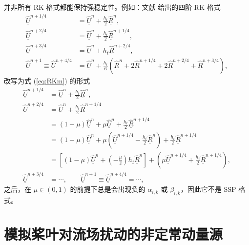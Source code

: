 并非所有 RK 格式都能保持强稳定性。例如：文献 \cite{Hirsch_2007} 给出的四阶 RK 格式
\begin{equation}
\begin{aligned}\underline{\hat{U}}^{n+1/4} & =\underline{\hat{U}}^{n}+\frac{h_{t}}{2}\underline{\hat{R}}^{n},\\
\underline{\hat{U}}^{n+2/4} & =\underline{\hat{U}}^{n}+\frac{h_{t}}{2}\underline{\hat{R}}^{n+1/4},\\
\underline{\hat{U}}^{n+3/4} & =\underline{\hat{U}}^{n}+h_{t}\underline{\hat{R}}^{n+2/4},\\
\underline{\hat{U}}^{n+1}\equiv\underline{\hat{U}}^{n+4/4} & =\underline{\hat{U}}^{n}+\frac{h_{t}}{6}\left(\underline{\hat{R}}^{n}+2\underline{\hat{R}}^{n+1/4}+2\underline{\hat{R}}^{n+2/4}+\underline{\hat{R}}^{n+3/4}\right),
\end{aligned}
\end{equation}
改写为式 (\ref{eq:RKm}) 的形式
\begin{equation}
\begin{aligned}\underline{\hat{U}}^{n+1/4} & =\underline{\hat{U}}^{n}+\frac{h_{t}}{2}\underline{\hat{R}}^{n},\\
\underline{\hat{U}}^{n+2/4} & =\underline{\hat{U}}^{n}+\frac{h_{t}}{2}\underline{\hat{R}}^{n+1/4}\\
 & =(1-\mu)\underline{\hat{U}}^{n}+\mu\underline{\hat{U}}^{n}+\frac{h_{t}}{2}\underline{\hat{R}}^{n+1/4}\\
 & =(1-\mu)\underline{\hat{U}}^{n}+\mu\left(\underline{\hat{U}}^{n+1/4}-\frac{h_{t}}{2}\underline{\hat{R}}^{n}\right)+\frac{h_{t}}{2}\underline{\hat{R}}^{n+1/4}\\
 & =\left[(1-\mu)\underline{\hat{U}}^{n}+\left(-\frac{\mu}{2}\right)h_{t}\underline{\hat{R}}^{n}\right]+\left(\mu\underline{\hat{U}}^{n+1/4}+\frac{h_{t}}{2}\underline{\hat{R}}^{n+1/4}\right),\\
\underline{\hat{U}}^{n+3/4} & =\cdots,\qquad\underline{\hat{U}}^{n+1}\equiv\underline{\hat{U}}^{n+4/4}=\cdots,
\end{aligned}
\end{equation}
之后，在 $\mu\in(0,1)$ 的前提下总是会出现负的 $\alpha_{i,k}$ 或 $\beta_{i,k}$，因此它不是
SSP 格式。

\section{模拟桨叶对流场扰动的非定常动量源\label{sec:UMS}}

